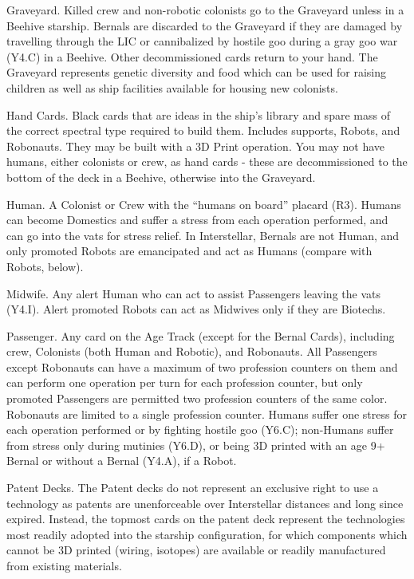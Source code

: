 \documentclass[a4paper]{book}
\begin{document}
Graveyard. Killed crew and non-robotic colonists go to the Graveyard unless in a Beehive starship. Bernals are discarded to the Graveyard if they are damaged by travelling through the LIC or cannibalized by hostile goo during a gray goo war (Y4.C) in a Beehive. Other decommissioned cards return to your hand. The Graveyard represents genetic diversity and food which can be used for raising children as well as ship facilities available for housing new colonists.

Hand Cards. Black cards that are ideas in the ship’s library and spare mass of the correct spectral type required to build them. Includes supports, Robots, and Robonauts. They may be built with a 3D Print operation. You may not have humans, either colonists or crew, as hand cards - these are decommissioned to the bottom of the deck in a Beehive, otherwise into the Graveyard.
 
Human. A Colonist or Crew with the “humans on board” placard (R3). Humans can become Domestics and suffer a stress from each operation performed, and can go into the vats for stress relief. In Interstellar, Bernals are not Human, and only promoted Robots are emancipated and act as Humans (compare with Robots, below).
 
Midwife. Any alert Human who can act to assist Passengers leaving the vats (Y4.I). Alert promoted Robots can act as Midwives only if they are Biotechs.

Passenger. Any card on the Age Track (except for the Bernal Cards), including crew,  Colonists (both Human and Robotic), and Robonauts. All Passengers except Robonauts can have a maximum of two profession counters on them and can perform one operation per turn for each profession counter, but only promoted Passengers are permitted two profession counters of the same color. Robonauts are limited to a single profession counter. Humans suffer one stress for each operation performed or by fighting hostile goo (Y6.C); non-Humans suffer from stress only during mutinies (Y6.D), or being 3D printed with an age 9+ Bernal or without a Bernal (Y4.A), if a Robot.

Patent Decks. The Patent decks do not represent an exclusive right to use a technology as patents are unenforceable over Interstellar distances and long since expired. Instead, the topmost cards on the patent deck represent the technologies most readily adopted into the starship configuration, for which components which cannot be 3D printed (wiring, isotopes) are available or readily manufactured from existing materials.
\end{document}
